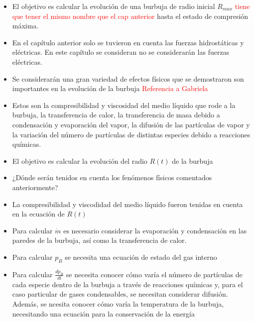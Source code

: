 \documentclass[aps,prb,twocolumn,superscriptaddress,floatfix,longbibliography,10pt]{revtex4-2}
\newif\ifptitle
\newif\ifpnumber
\newcounter{para}
\newcommand\ptitle[1]{\par\refstepcounter{para}
{\ifpnumber{\noindent\textcolor{lightgray}{\textbf{\thepara}}\indent}\fi}
{\ifptitle{\textbf{[{#1}]}}\fi}}
\begin{document}
\ptitle{Descripción general de los fenómenos}
\begin{itemize}
  \item El objetivo es calcular la evolución de una burbuja de radio inicial $R_{max}$ \textcolor{red}{tiene que tener el mismo nombre que el cap anterior} hasta el estado de compresión máxima.
  \item En el capítulo anterior solo se tuvieron en cuenta las fuerzas hidrostáticas y eléctricas. En este capítulo se consideran no se considerarán las fuerzas eléctricas.
  \item Se considerarán una gran variedad de efectos físicos que se demostraron son importantes en la evolución de la burbuja \textcolor{red}{Referencia a Gabriela}
  \item Estos son la compresibilidad y viscosidad del medio líquido que rode a la burbuja, la transferencia de calor, la transferencia de masa debido a condensación y evaporación del vapor, la difusión de las partículas de vapor y la variación del número de partículas de distintas especies debido a reacciones químicas.
  \item El objetivo es calcular la evolución del radio $R(t)$ de la burbuja
\end{itemize}


\ptitle{¿Dónde se considerará cada fenómeno?}
\begin{itemize}
  \item ¿Dónde serán tenidos en cuenta los fenómenos físicos comentados anteriormente?
  \item La compresibilidad y viscodidad del medio líquido fueron tenidas en cuenta en la ecuación de $R(t)$
  \item Para calcular $\dot{m}$ es necesario considerar la evaporación y condensación en las paredes de la burbuja, así como la transferencia de calor.
  \item Para calcular $p_B$ se necesita una ecuación de estado del gas interno
  \item Para calcular $\frac{dp_B}{dt}$ se necesita conocer cómo varía el número de partículas de cada especie dentro de la burbuja a través de reacciones químicas y, para el caso particular de gases condensables, se necesitan considerar difusión. Además, se ncesita conocer cómo varía la temperatura de la burbuja, necesitando una ecuación para la conservación de la energía
\end{itemize}
\end{document}
